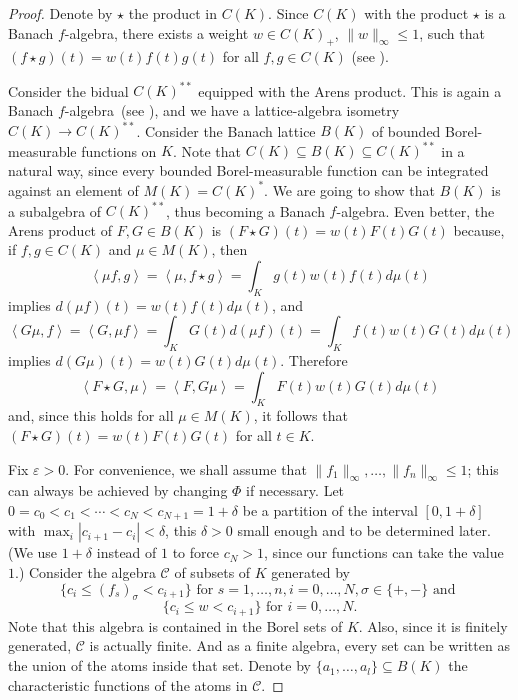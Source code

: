 \documentclass{memo-l}
\theoremstyle{definition}
\theoremstyle{remark}
\numberwithin{section}{chapter}
\numberwithin{equation}{chapter}
\newcommand{\falg}{$f\!$-algebra}
\begin{document}
\begin{proof}
    Denote by $\star$ the product in $C(K)$. Since $C(K)$ with the
    product $\star$ is a Banach \falg, there exists a weight $w \in
    C(K)_+$, $\|w\|_\infty \le 1$, such that $(f\star
    g)(t)=w(t)f(t)g(t)$ for all $f,g \in C(K)$ (see \cite[Korollar
    1.4]{scheffold1981}).

    Consider the bidual $C(K)^{* *}$
    equipped with the Arens product. This is again a Banach \falg\
    (see \cite{scheffold1991}), and
    we have a lattice-algebra isometry $C(K)\to C(K)^{* *}$.
    Consider the Banach lattice $B(K)$ of bounded Borel-measurable
    functions on $K$.
    Note that $C(K)\subseteq B(K)\subseteq C(K)^{* *}$ in a natural way,
    since every bounded Borel-measurable function can be integrated against an
    element of $M(K)=C(K)^{*}$. We are going to show that $B(K)$ is a
    subalgebra of $C(K)^{* *}$, thus becoming a Banach \falg. Even
    better, the Arens product of $F, G \in B(K)$ is $(F\star
    G)(t)=w(t)F(t)G(t)$ because, if $f,g \in C(K)$ and $\mu \in M(K)$,
    then
    \[
        \left< \mu f,g \right> = \left< \mu ,f\star g \right> =
        \int_{K}^{} g(t) w(t) f(t) d \mu (t)
    \]
    implies $d(\mu f)(t)=w(t) f(t) d \mu (t)$, and
    \[
    \left< G \mu ,f \right> = \left< G, \mu f \right> = \int_{K}^{}
        G(t) d(\mu f)(t)=\int_{K}^{} f(t)w(t)G(t)d \mu (t)
    \]
    implies $d(G \mu )(t)=w(t)G(t)d \mu (t)$. Therefore
    \[
    \left< F\star G, \mu  \right> = \left< F,G \mu \right>
    =\int_{K}^{} F(t)w(t)G(t)d \mu (t)
    \]
    and, since this holds for all $\mu  \in M(K)$, it follows that
    $(F\star G)(t)=w(t)F(t)G(t)$ for all $t \in K$.

    Fix $\varepsilon >0$. For convenience, we shall assume that
    $\|f_1\|_\infty ,\ldots ,\|f_n\|_\infty \le 1$; this can always be
    achieved by changing $\Phi $ if necessary. Let $0=c_0<c_1<\cdots
    <c_N<c_{N+1}=1+\delta$ be
    a partition of the interval $[0,1+\delta ]$ with $\max_i
    |c_{i+1}-c_i|<\delta  $, this $\delta  >0$ small enough and to be
    determined later. (We use $1+\delta $ instead of $1$ to force
    $c_N>1$, since our functions can take the value $1$.)
    Consider the algebra $\mathcal{C}$ of subsets of $K$ generated by
    \[
        \{c_i\le (f _s)_\sigma < c_{i+1}\}\text{ for }s =1,\ldots
        ,n,
        i=0,\ldots ,N, \sigma \in \{+, -\}\text{ and }
    \]
    \[
        \{c_i\le w < c_{i+1}\}\text{ for }i=0,\ldots ,N.
    \]
    Note that this algebra is contained in the Borel sets of
    $K$. Also, since it is finitely generated, $\mathcal{C}$ is
    actually finite. And as a finite algebra, every set can be
    written as the union of the atoms inside that set. Denote by
    $\{a_1,\ldots, a_l\}\subseteq B(K)$ the characteristic functions of
    the atoms in $\mathcal{C}$.


\end{proof}
\end{document}
